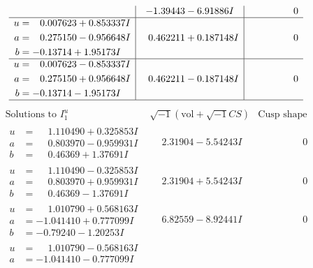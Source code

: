 \documentclass[1p]{elsarticle_modified}
\theoremstyle{definition}
\newcommand{\I}{\sqrt{-1}}
\begin{document}
$$\begin{array}{c|c|c}
 & -1.39443 - 6.91886 I & \phantom{-0.000000 } 0 \\ \hline\begin{aligned}
u &= \phantom{-}0.007623 + 0.853337 I \\
a &= \phantom{-}0.275150 - 0.956648 I \\
b &= -0.13714 + 1.95173 I\end{aligned}
 & \phantom{-}0.462211 + 0.187148 I & \phantom{-0.000000 } 0 \\ \hline\begin{aligned}
u &= \phantom{-}0.007623 - 0.853337 I \\
a &= \phantom{-}0.275150 + 0.956648 I \\
b &= -0.13714 - 1.95173 I\end{aligned}
 & \phantom{-}0.462211 - 0.187148 I & \phantom{-0.000000 } 0\\
 \hline 
 \end{array}$$\newpage$$\begin{array}{c|c|c}  
\text{Solutions to }I^u_{1}& \I (\text{vol} + \sqrt{-1}CS) & \text{Cusp shape}\\
 \hline 
\begin{aligned}
u &= \phantom{-}1.110490 + 0.325853 I \\
a &= \phantom{-}0.803970 - 0.959931 I \\
b &= \phantom{-}0.46369 + 1.37691 I\end{aligned}
 & \phantom{-}2.31904 - 5.54243 I & \phantom{-0.000000 } 0 \\ \hline\begin{aligned}
u &= \phantom{-}1.110490 - 0.325853 I \\
a &= \phantom{-}0.803970 + 0.959931 I \\
b &= \phantom{-}0.46369 - 1.37691 I\end{aligned}
 & \phantom{-}2.31904 + 5.54243 I & \phantom{-0.000000 } 0 \\ \hline\begin{aligned}
u &= \phantom{-}1.010790 + 0.568163 I \\
a &= -1.041410 + 0.777099 I \\
b &= -0.79240 - 1.20253 I\end{aligned}
 & \phantom{-}6.82559 - 8.92441 I & \phantom{-0.000000 } 0 \\ \hline\begin{aligned}
u &= \phantom{-}1.010790 - 0.568163 I \\
a &= -1.041410 - 0.777099 I \\

\end{aligned}
\end{array}$$
\end{document}
